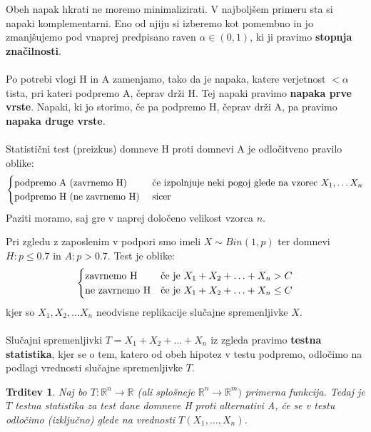 \documentclass[11pt]{article}
\newtheorem{Trditev}[Izrek]{{\sc Trditev}}
\begin{document}
	Obeh napak hkrati ne moremo minimalizirati. V najboljšem primeru sta si napaki komplementarni. Eno od njiju si izberemo kot pomembno in jo zmanjšujemo pod vnaprej predpisano raven $\alpha \in (0,1)$, ki ji pravimo \textbf{stopnja značilnosti}.
	\\
	\\
	Po potrebi vlogi H in A zamenjamo, tako da je napaka, katere verjetnost $< \alpha$ tista, pri kateri podpremo A, čeprav drži H. Tej napaki pravimo \textbf{napaka prve vrste}. Napaki, ki jo storimo, če pa podpremo H, čeprav drži A, pa pravimo \textbf{napaka druge vrste}.
	\\
	\\
	Statistični test (preizkus) domneve H proti domnevi A je odločitveno pravilo oblike:
	\[
	\begin{cases}
	\textnormal{podpremo A (zavrnemo H)} & \textnormal{če izpolnjuje neki pogoj glede na vzorec } X_1,\ldots X_n\\
	\textnormal{podpremo H (ne zavrnemo H) } & \textnormal{sicer }
	\end{cases}
	\]
	Paziti moramo, saj gre v naprej določeno velikost vzorca $n$.
\pagebreak

	Pri zgledu z zaposlenim v podpori smo imeli $X\sim Bin(1,p)$ ter domnevi $H: p\le 0.7$ in $A: p>0.7$. Test je oblike:
		\[
	\begin{cases}
	\textnormal{zavrnemo H} & \textnormal{če je } X_1 + X_2 +\ldots + X_n > C\\
	\textnormal{ne zavrnemo H} & \textnormal{če je }  X_1 + X_2 +\ldots + X_n \le C
	\end{cases}
	\]
	kjer so $X_1, X_2,\ldots X_n$ neodvisne replikacije slučajne spremenljivke $X$.
	\\
	\\
	Slučajni spremenljivki $ T = X_1 + X_2 +\ldots + X_n$ iz zgleda pravimo \textbf{testna statistika}, kjer se o tem, katero od obeh hipotez v testu podpremo, odločimo na podlagi vrednosti slučajne spremenljivke $T$.
	\begin{Trditev}
			Naj bo $T: \mathbb{R}^n \to \mathbb{R}$ (ali splošneje $\mathbb{R}^n \to \mathbb{R}^m)$ primerna funkcija. Tedaj je $T$ testna statistika za test dane domneve H proti alternativi A, če se v testu odločimo (izključno) glede na vrednosti $T(X_1, \ldots, X_n)$.
	\end{Trditev}
	
\end{document}
